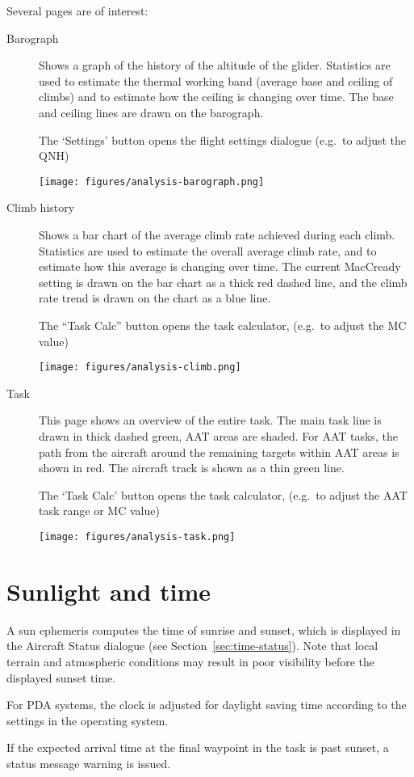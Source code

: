 Several pages are of interest:
\begin{description}
\item[Barograph]  Shows a graph of the history of the altitude of the glider.
  Statistics are used to estimate the thermal working band (average
  base and ceiling of climbs) and to estimate how the ceiling is
  changing over time.  The base and ceiling lines are drawn on the
  barograph.

  The `Settings' button opens the flight settings dialogue
  (e.g.\ to adjust the QNH)

\begin{center}
\texttt{[image: figures/analysis-barograph.png]}
\end{center}

\item[Climb history]
  Shows a bar chart of the average climb rate achieved during each
  climb.  Statistics are used to estimate the overall average climb
  rate, and to estimate how this average is changing over time.  The
  current MacCready setting is drawn on the bar chart as a thick red
  dashed line, and the climb rate trend is drawn on the chart as a
  blue line.

  The ``Task Calc'' button opens the task calculator,
  (e.g.\ to adjust the MC value)

\begin{center}
\texttt{[image: figures/analysis-climb.png]}
\end{center}

\item[Task]
  This page shows an overview of the entire task.  The main task line
  is drawn in thick dashed green, AAT areas are shaded.  For AAT
  tasks, the path from the aircraft around the remaining targets within AAT
  areas is shown in red.  The aircraft track is shown as a thin green line.

  The `Task Calc' button opens the task calculator,
  (e.g.\ to adjust the AAT task range or MC value)

\begin{center}
\texttt{[image: figures/analysis-task.png]}
\end{center}

\end{description}

\section{Sunlight and time}

A sun ephemeris computes the time of sunrise and sunset, which is displayed in the
Aircraft Status dialogue (see Section~\ref{sec:time-status}).  Note that
local terrain and atmospheric conditions may result in poor visibility
before the displayed sunset time.

For PDA systems, the clock is adjusted for daylight saving time according
to the settings in the operating system.

If the expected arrival time at the final waypoint in the task is past
sunset, a status message warning is issued.
